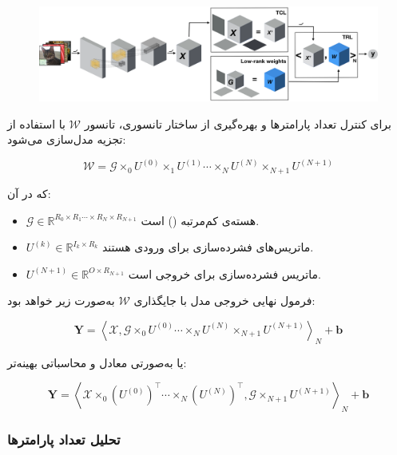 \begin{figure}[h]
	\centering
	\begin{minipage}[b]{0.7\textwidth}
		\centering
		\includegraphics[width=\textwidth]{transformer_images/trl.png}
		\caption{}
		\label{fig:tensor_regression_network}
	\end{minipage}
	\hfill
\end{figure}





برای کنترل تعداد پارامترها و بهره‌گیری از ساختار تانسوری، تانسور $\mathcal{W}$ با استفاده از تجزیه  مدل‌سازی می‌شود:

\[
\mathcal{W} = \mathcal{G} \times_0 U^{(0)} \times_1 U^{(1)} \cdots \times_N U^{(N)} \times_{N+1} U^{(N+1)}
\]

که در آن:

\begin{itemize}
	\item $\mathcal{G} \in \mathbb{R}^{R_0 \times R_1 \cdots \times R_N \times R_{N+1}}$ هسته‌ی کم‌مرتبه () است.
	\item $U^{(k)} \in \mathbb{R}^{I_k \times R_k}$ ماتریس‌های فشرده‌سازی برای ورودی هستند.
	\item $U^{(N+1)} \in \mathbb{R}^{O \times R_{N+1}}$ ماتریس فشرده‌سازی برای خروجی است.
\end{itemize}

فرمول نهایی خروجی مدل با جایگذاری $\mathcal{W}$ به‌صورت زیر خواهد بود:

\[
\mathbf{Y} = \left\langle \mathcal{X}, \mathcal{G} \times_0 U^{(0)} \cdots \times_N U^{(N)} \times_{N+1} U^{(N+1)} \right\rangle_N + \mathbf{b}
\]

یا به‌صورتی معادل و محاسباتی بهینه‌تر:

\[
\mathbf{Y} = \left\langle \mathcal{X} \times_0 (U^{(0)})^\top \cdots \times_N (U^{(N)})^\top, \mathcal{G} \times_{N+1} U^{(N+1)} \right\rangle_N + \mathbf{b}
\]

\subsubsection*{تحلیل تعداد پارامترها}

